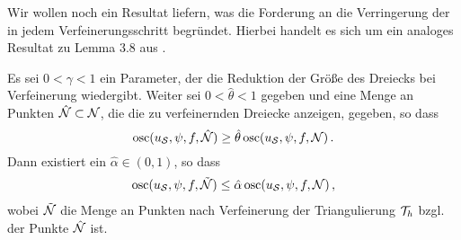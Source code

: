 Wir wollen noch ein Resultat liefern, was die Forderung an die Verringerung der  in jedem Verfeinerungsschritt begründet. Hierbei handelt es sich um ein analoges Resultat zu Lemma 3.8 aus \cite{MorNoc}.

\begin{lemma}\label{lem:4.24}
Es sei $0 < \gamma < 1$ ein Parameter, der die Reduktion der Größe des Dreiecks bei Verfeinerung wiedergibt. Weiter sei $0 < \hat \theta < 1$ gegeben und eine Menge an Punkten $\hat{\mathcal N}\subset \mathcal N$, die die zu verfeinernden Dreiecke anzeigen, gegeben, so dass
\[
	\operatorname{osc}(u_{\mathcal S},\psi,f,\hat{\mathcal N}) \ge \hat\theta \operatorname{osc} (u_{\mathcal S},\psi,f,\mathcal N) \, .
\]
Dann existiert ein $\hat\alpha \in (0,1)$, so dass
\begin{align}\label{eq:my4.70}
	\operatorname{osc}(u_{\mathcal S},\psi,f,\tilde{\mathcal N}) \le \hat \alpha \operatorname{osc} (u_{\mathcal S},\psi,f,\mathcal N) \, ,
\end{align}
wobei $\tilde{\mathcal N}$ die Menge an Punkten nach Verfeinerung der Triangulierung $\mathcal T_h$ bzgl. der Punkte $\hat{\mathcal N}$ ist.
\end{lemma}

